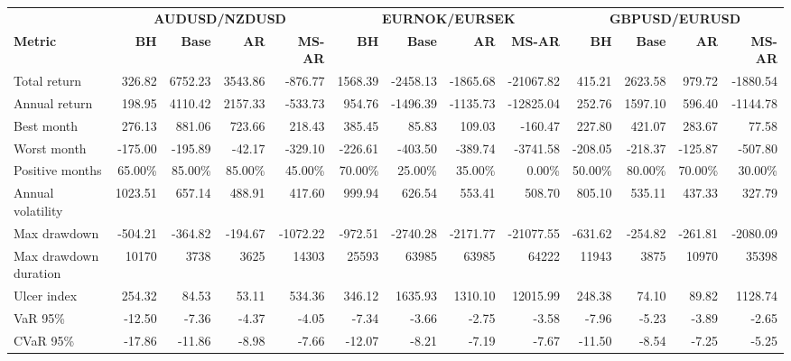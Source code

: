 \begin{table}[H]
\begin{adjustbox}{max width=\linewidth, max totalheight=0.90\textheight}
\begin{tabular}{lrrrrrrrrrrrr}
\toprule
& \multicolumn{4}{c}{\textbf{AUDUSD/NZDUSD}}
& \multicolumn{4}{c}{\textbf{EURNOK/EURSEK}}
& \multicolumn{4}{c}{\textbf{GBPUSD/EURUSD}} \\
\cmidrule(lr){2-5}
\cmidrule(lr){6-9}
\cmidrule(lr){10-13}
\textbf{Metric}
& \textbf{BH} & \textbf{Base} & \textbf{AR} & \textbf{MS-AR}
& \textbf{BH} & \textbf{Base} & \textbf{AR} & \textbf{MS-AR}
& \textbf{BH} & \textbf{Base} & \textbf{AR} & \textbf{MS-AR} \\
\midrule
Total return              & 326.82 & 6752.23 & 3543.86 & -876.77 & 1568.39 & -2458.13 & -1865.68 & -21067.82 & 415.21 & 2623.58 & 979.72 & -1880.54 \\
Annual return             & 198.95 & 4110.42 & 2157.33 & -533.73 & 954.76 & -1496.39 & -1135.73 & -12825.04 & 252.76 & 1597.10 & 596.40 & -1144.78 \\
Best month                & 276.13 & 881.06 & 723.66 & 218.43 & 385.45 & 85.83 & 109.03 & -160.47 & 227.80 & 421.07 & 283.67 & 77.58 \\
Worst month               & -175.00 & -195.89 & -42.17 & -329.10 & -226.61 & -403.50 & -389.74 & -3741.58 & -208.05 & -218.37 & -125.87 & -507.80 \\
Positive months           & 65.00\% & 85.00\% & 85.00\% & 45.00\% & 70.00\% & 25.00\% & 35.00\% & 0.00\% & 50.00\% & 80.00\% & 70.00\% & 30.00\% \\
Annual volatility         & 1023.51 & 657.14 & 488.91 & 417.60 & 999.94 & 626.54 & 553.41 & 508.70 & 805.10 & 535.11 & 437.33 & 327.79 \\
Max drawdown              & -504.21 & -364.82 & -194.67 & -1072.22 & -972.51 & -2740.28 & -2171.77 & -21077.55 & -631.62 & -254.82 & -261.81 & -2080.09 \\
Max drawdown duration     & 10170 & 3738 & 3625 & 14303 & 25593 & 63985 & 63985 & 64222 & 11943 & 3875 & 10970 & 35398 \\
Ulcer index               & 254.32 & 84.53 & 53.11 & 534.36 & 346.12 & 1635.93 & 1310.10 & 12015.99 & 248.38 & 74.10 & 89.82 & 1128.74 \\
VaR 95\%                  & -12.50 & -7.36 & -4.37 & -4.05 & -7.34 & -3.66 & -2.75 & -3.58 & -7.96 & -5.23 & -3.89 & -2.65 \\
CVaR 95\%                 & -17.86 & -11.86 & -8.98 & -7.66 & -12.07 & -8.21 & -7.19 & -7.67 & -11.50 & -8.54 & -7.25 & -5.25 \\

\end{tabular}
\end{adjustbox}
\end{table}
